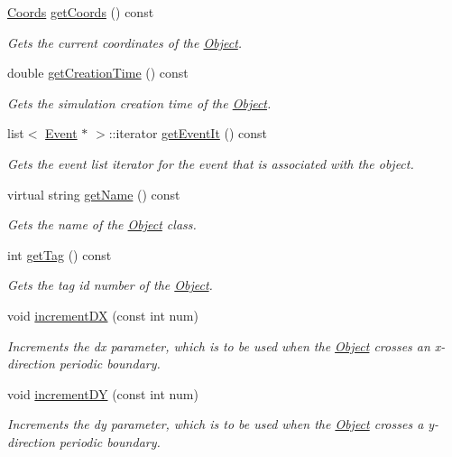 \begin{DoxyCompactItemize}
\hyperlink{struct_coords}{Coords} \hyperlink{class_object_a08df08943dc634609fa69b356a37d73f}{get\+Coords} () const
\begin{DoxyCompactList}\small\item\em Gets the current coordinates of the \hyperlink{class_object}{Object}. \end{DoxyCompactList}\item 
double \hyperlink{class_object_a6f91c3f8b61cb9c9a8db662ac07d92e9}{get\+Creation\+Time} () const
\begin{DoxyCompactList}\small\item\em Gets the simulation creation time of the \hyperlink{class_object}{Object}. \end{DoxyCompactList}\item 
list$<$ \hyperlink{class_event}{Event} $\ast$ $>$\+::iterator \hyperlink{class_object_aa7c58e0319b7715c8d36f38ca7acf03e}{get\+Event\+It} () const
\begin{DoxyCompactList}\small\item\em Gets the event list iterator for the event that is associated with the object. \end{DoxyCompactList}\item 
virtual string \hyperlink{class_object_ade517616d51cd9ab581ec5afeb37b313}{get\+Name} () const
\begin{DoxyCompactList}\small\item\em Gets the name of the \hyperlink{class_object}{Object} class. \end{DoxyCompactList}\item 
int \hyperlink{class_object_aa9653577e8d0ac4b7b86d23d12f8b31b}{get\+Tag} () const
\begin{DoxyCompactList}\small\item\em Gets the tag id number of the \hyperlink{class_object}{Object}. \end{DoxyCompactList}\item 
void \hyperlink{class_object_a3d7c877f4aa179d9a56050c5faddc18d}{increment\+DX} (const int num)
\begin{DoxyCompactList}\small\item\em Increments the dx parameter, which is to be used when the \hyperlink{class_object}{Object} crosses an x-\/direction periodic boundary. \end{DoxyCompactList}\item 
void \hyperlink{class_object_a9df010818be72d15bad7985bf8a89ba0}{increment\+DY} (const int num)
\begin{DoxyCompactList}\small\item\em Increments the dy parameter, which is to be used when the \hyperlink{class_object}{Object} crosses a y-\/direction periodic boundary. \end{DoxyCompactList}\item 

\end{DoxyCompactItemize}
